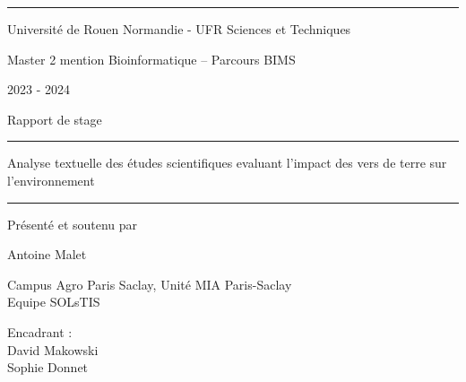 \documentclass{book}
\begin{document}
\vspace{0.5cm}
\hrule
\vspace{0.5cm}

\begin{center}
    \large{Université de Rouen Normandie - UFR Sciences et Techniques}
\end{center}

\begin{center}
    \large{Master 2 mention Bioinformatique – Parcours BIMS}
\end{center}

\begin{center}
    \large{2023 - 2024}
\end{center}

\vspace{1cm}

\begin{center}
    \Large{Rapport de stage}
\end{center}

\begin{center}
    \vspace{1cm}
    \hrule
    \vspace{1cm}
    \huge{Analyse textuelle des études scientifiques evaluant l’impact des vers
        de terre sur l’environnement}
    \vspace{1cm}
    \hrule
    \vspace{1cm}
\end{center}

\begin{center}
    \large{Présenté et soutenu par}
\end{center}

\begin{center}
    \huge{Antoine Malet}
\end{center}

\begin{center}
    \vspace{1.5cm}
    \Large{Campus Agro Paris Saclay, Unité MIA Paris-Saclay} \\
    \Large{Equipe SOLsTIS}
\end{center}

\begin{center}
    \vspace{0.5cm}
    \large{Encadrant :} \\
    \vspace{0.5cm}
    \large{David Makowski} \\
    \large{Sophie Donnet}
\end{center}
\end{document}
